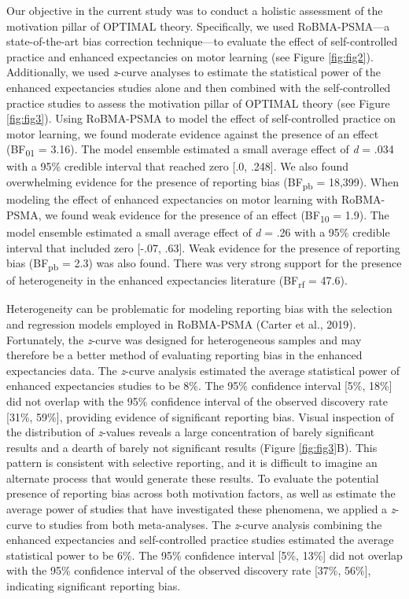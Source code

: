 \documentclass[
  doc, donotrepeattitle,floatsintext]{apa7}
\begin{document}
Our objective in the current study was to conduct a holistic assessment of the motivation pillar of OPTIMAL theory. Specifically, we used RoBMA-PSMA---a state-of-the-art bias correction technique---to evaluate the effect of self-controlled practice and enhanced expectancies on motor learning (see Figure \ref{fig:fig2}). Additionally, we used \emph{z}-curve analyses to estimate the statistical power of the enhanced expectancies studies alone and then combined with the self-controlled practice studies to assess the motivation pillar of OPTIMAL theory (see Figure \ref{fig:fig3}). Using RoBMA-PSMA to model the effect of self-controlled practice on motor learning, we found moderate evidence against the presence of an effect (BF\textsubscript{01} = 3.16). The model ensemble estimated a small average effect of \emph{d} = .034 with a 95\% credible interval that reached zero {[}.0, .248{]}. We also found overwhelming evidence for the presence of reporting bias (BF\textsubscript{pb} = 18,399). When modeling the effect of enhanced expectancies on motor learning with RoBMA-PSMA, we found weak evidence for the presence of an effect (BF\textsubscript{10} = 1.9). The model ensemble estimated a small average effect of \emph{d} = .26 with a 95\% credible interval that included zero {[}-.07, .63{]}. Weak evidence for the presence of reporting bias (BF\textsubscript{pb} = 2.3) was also found. There was very strong support for the presence of heterogeneity in the enhanced expectancies literature (BF\textsubscript{rf} = 47.6).

Heterogeneity can be problematic for modeling reporting bias with the selection and regression models employed in RoBMA-PSMA (Carter et al., 2019). Fortunately, the \emph{z}-curve was designed for heterogeneous samples and may therefore be a better method of evaluating reporting bias in the enhanced expectancies data. The \emph{z}-curve analysis estimated the average statistical power of enhanced expectancies studies to be 8\%. The 95\% confidence interval {[}5\%, 18\%{]} did not overlap with the 95\% confidence interval of the observed discovery rate {[}31\%, 59\%{]}, providing evidence of significant reporting bias. Visual inspection of the distribution of \emph{z}-values reveals a large concentration of barely significant results and a dearth of barely not significant results (Figure \ref{fig:fig3}B). This pattern is consistent with selective reporting, and it is difficult to imagine an alternate process that would generate these results. To evaluate the potential presence of reporting bias across both motivation factors, as well as estimate the average power of studies that have investigated these phenomena, we applied a \emph{z}-curve to studies from both meta-analyses. The \emph{z}-curve analysis combining the enhanced expectancies and self-controlled practice studies estimated the average statistical power to be 6\%. The 95\% confidence interval {[}5\%, 13\%{]} did not overlap with the 95\% confidence interval of the observed discovery rate {[}37\%, 56\%{]}, indicating significant reporting bias.
\end{document}
